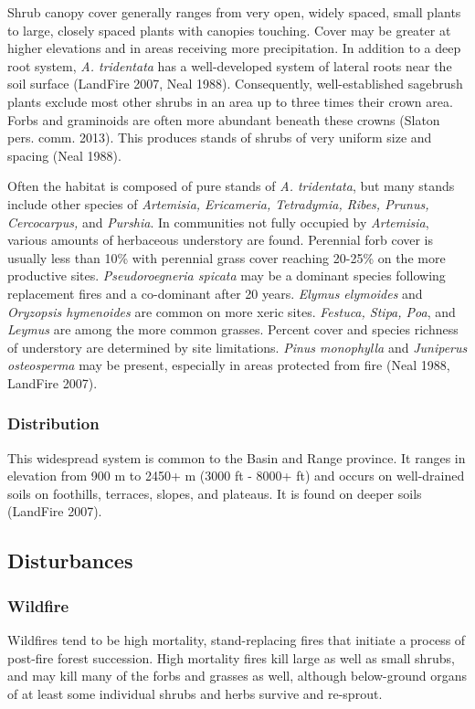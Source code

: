 Shrub canopy cover generally ranges from very open, widely spaced, small plants to large, closely spaced plants with canopies touching. Cover may be greater at higher elevations and in areas receiving more precipitation. In addition to a deep root system, \emph{A. tridentata} has a well-developed system of lateral roots near the soil surface (LandFire 2007, Neal 1988). Consequently, well-established sagebrush plants exclude most other shrubs in an area up to three times their crown area. Forbs and graminoids are often more abundant beneath these crowns (Slaton pers. comm. 2013). This produces stands of shrubs of very uniform size and spacing (Neal 1988).

Often the habitat is composed of pure stands of \emph{A. tridentata}, but many stands include other species of \emph{Artemisia, Ericameria, Tetradymia, Ribes, Prunus, Cercocarpus,} and \emph{Purshia}. In communities not fully occupied by \emph{Artemisia}, various amounts of herbaceous understory are found. Perennial forb cover is usually less than 10\% with perennial grass cover reaching 20-25\% on the more productive sites. \emph{Pseudoroegneria spicata} may be a dominant species following replacement fires and a co-dominant after 20 years. \emph{Elymus elymoides} and \emph{Oryzopsis hymenoides} are common on more xeric sites. \emph{Festuca, Stipa, Poa}, and \emph{Leymus} are among the more common grasses. Percent cover and species richness of understory are determined by site limitations. \emph{Pinus monophylla} and \emph{Juniperus osteosperma} may be present, especially in areas protected from fire (Neal 1988, LandFire 2007).


\subsubsection*{Distribution}
This widespread system is common to the Basin and Range province. It ranges in elevation from 900 m to 2450+ m (3000 ft - 8000+ ft) and occurs on well-drained soils on foothills, terraces, slopes, and plateaus. It is found on deeper soils (LandFire 2007).

\subsection*{Disturbances}


\subsubsection*{Wildfire}
Wildfires tend to be high mortality, stand-replacing fires that initiate a process of post-fire forest succession. High mortality fires kill large as well as small shrubs, and may kill many of the forbs and grasses as well, although below-ground organs of at least some individual shrubs and herbs survive and re-sprout. 

